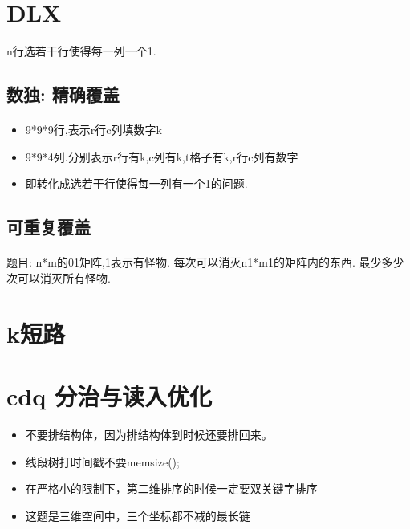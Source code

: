 \documentclass[landscape]{report}
\newcommand{\includecode}[2][c]{}
\begin{document}
\begin{flushleft}
\begin{multicols}{2}
\section{ DLX}
n行选若干行使得每一列一个1.
\subsection{ 数独: 精确覆盖}
 \paragraph{ }
 \begin{itemize}
 \item 9*9*9行,表示r行c列填数字k
 \item 9*9*4列.分别表示r行有k,c列有k,t格子有k,r行c列有数字
 \item 即转化成选若干行使得每一列有一个1的问题.
 \end{itemize}
 \includecode[c++]{poj3074.cpp}
 \subsection{ 可重复覆盖}
 \paragraph{}
 题目: n*m的01矩阵,1表示有怪物. 每次可以消灭n1*m1的矩阵内的东西. 最少多少次可以消灭所有怪物.
 \includecode[c++]{fzu1686.cpp}
\section{ k短路}
\includecode[c++]{poj2449.cpp}
\section{ cdq 分治与读入优化}
\begin{itemize}

\item 不要排结构体，因为排结构体到时候还要排回来。
\item 线段树打时间戳不要memsize();
\item 在严格小的限制下，第二维排序的时候一定要双关键字排序
\item 这题是三维空间中，三个坐标都不减的最长链

\end{itemize}
\includecode[c++]{hdu4742.cpp}
\end{multicols}
\end{flushleft}
\end{document}

